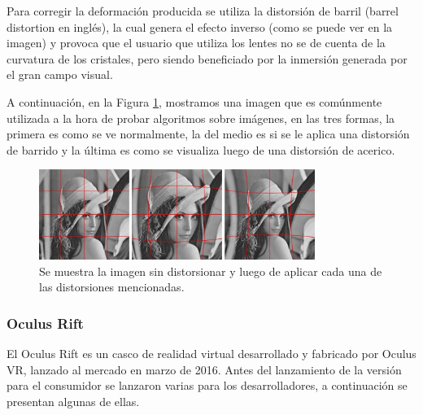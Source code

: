 \documentclass[12pt]{article}
\begin{document}
Para corregir la deformación producida se utiliza la distorsión de barril (barrel distortion en inglés), la cual genera el efecto inverso (como se puede ver en la imagen) y provoca que el usuario que utiliza los lentes no se de cuenta de la curvatura de los cristales, pero siendo beneficiado por la inmersión generada por el gran campo visual\cite{oculusrendering}. 

A continuación, en la Figura \ref{lenna}, mostramos una imagen que es comúnmente utilizada a la hora de probar algoritmos sobre imágenes, en las tres formas, la primera es como se ve normalmente, la del medio es si se le aplica una distorsión de barrido y la última es como se visualiza luego de una distorsión de acerico.
\begin{figure}[h!]
\includegraphics[width=0.8\textwidth, center]{imagen_clasica.png}
\caption{Se muestra la imagen sin distorsionar y luego de aplicar cada una de las distorsiones mencionadas.}
\label{lenna}
\end{figure}

\subsubsection{ Oculus Rift}
\noindent El Oculus Rift es un casco de realidad virtual desarrollado y fabricado por Oculus VR, lanzado al mercado en marzo de 2016. Antes del lanzamiento de la versión para el consumidor se lanzaron varias para los desarrolladores, a continuación se presentan algunas de ellas\cite{oculus}.
\end{document}
